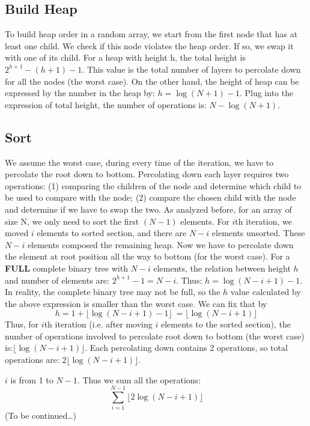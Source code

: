\documentclass[12pt]{book}
\begin{document}
\subsection{Build Heap}
\label{sec:orgb3ae80e}

To build heap order in a random array, we start from the first node that has at least one child. We check if this node violates the heap order. If so, we swap it with one of its child. For a heap with height h, the total height is \(2^{h+1}-(h+1)-1\). This value is the total number of layers to percolate down for all the nodes (the worst case). On the other hand, the height of heap can be expressed by the number in the heap by: \(h = \log(N + 1) - 1\). Plug into the expression of total height, the number of operations is: \(N - \log(N + 1)\).
\subsection{Sort}
\label{sec:org270909d}

We assume the worst case, during every time of the iteration, we have to percolate the root down to bottom. Percolating down each layer requires two operations: (1) comparing the children of the node and determine which child to be used to compare with the node; (2) compare the chosen child with the node and determine if we have to swap the two. As analyzed before, for an array of size N, we only need to sort the first \((N - 1)\) elements. For \(i\)th iteration, we moved \(i\) elements to sorted section, and there are \(N - i\) elements unsorted. These \(N - i\) elements composed the remaining heap. Now we have to percolate down the element at root position all the way to bottom (for the worst case). For a \textbf{FULL} complete binary tree with \(N - i\) elements, the relation between height \(h\) and number of elements are: \(2^{h + 1} - 1 = N - i\). Thus: \(h = \log(N - i + 1) - 1\). In reality, the complete binary tree may not be full, so the \(h\) value calculated by the above expression is smaller than the worst case. We can fix that by
\[h = 1 + \lfloor\log(N - i + 1) - 1\rfloor\ = \lfloor\log(N - i + 1)\rfloor\]
Thus, for \(i\)th iteration (i.e. after moving \(i\) elements to the sorted section), the number of operations involved to percolate root down to bottom (the worst case) is:\(\lfloor\log(N - i + 1)\rfloor\). Each percolating down contains 2 operations, so total operations are: \(2\lfloor\log(N - i + 1)\rfloor\).

\(i\) is from 1 to \(N - 1\). Thus we sum all the operations:
\begin{equation*}
\sum_{i = 1}^{N - 1} \lfloor2\log(N - i + 1)\rfloor
\end{equation*}
(To be continued\ldots{})
\end{document}
